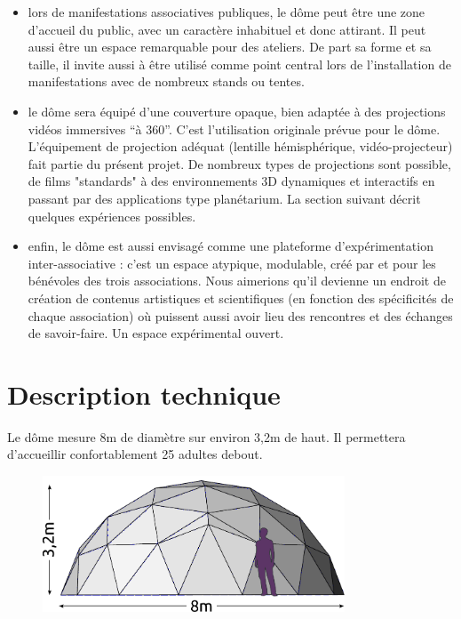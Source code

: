\documentclass[a4paper,12pt]{report}
\begin{document}
\begin{itemize}

	\item lors de manifestations associatives publiques, le dôme peut être une
	zone d'accueil du public, avec un caractère inhabituel et donc attirant. Il
	peut aussi être un espace remarquable pour des ateliers. De part sa forme
	et sa taille, il invite aussi à être utilisé comme point central lors de
	l'installation de manifestations avec de nombreux stands ou tentes.

	\item le dôme sera équipé d'une couverture opaque, bien adaptée à des
	projections vidéos immersives ``à 360''. C'est l'utilisation originale
	prévue pour le dôme. L'équipement de projection adéquat (lentille
	hémisphérique, vidéo-projecteur) fait partie du présent projet.  De nombreux
	types de projections sont possible, de films "standards" à des
	environnements 3D dynamiques et interactifs en passant par des applications
	type planétarium. La section suivant décrit quelques expériences possibles.

	\item enfin, le dôme est aussi envisagé comme une plateforme
	d'expérimentation inter-associative : c'est un espace atypique, modulable,
	créé par et pour les bénévoles des trois associations.  Nous aimerions
	qu'il devienne un endroit de création de contenus artistiques et
	scientifiques (en fonction des spécificités de chaque association) où
	puissent aussi avoir lieu des rencontres et des échanges de savoir-faire.
	Un espace expérimental ouvert.

\end{itemize}


\chapter{Description technique}

Le dôme mesure 8m de diamètre sur environ 3,2m de haut. Il permettera
d'accueillir confortablement 25 adultes debout.

\begin{figure}[!h]
\centering
\includegraphics[width=9cm]{dimensions.pdf}
\end{figure}
\end{document}
